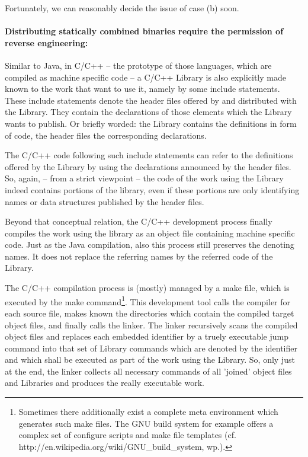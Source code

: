Fortunately, we can reasonably decide the issue of case (b) soon.

\paragraph{Distributing statically combined binaries require the
permission of reverse engineering:}

Similar to Java, in C/C++ -- the prototype of those languages, which are
compiled as machine specific code -- a C/C++ Library is also explicitly made
known to the work that want to use it, namely by some include statements. These
include statements denote the header files offered by and distributed with the
Library. They contain the declarations of those elements which the Library wants
to publish. Or briefly worded: the Library contains the definitions in form of
code, the header files the corresponding declarations.

The C/C++ code following such include statements can refer to the definitions
offered by the Library by using the declarations announced by the header files.
So, again, -- from a strict viewpoint -- the code of the work using the Library
indeed contains portions of the library, even if these portions are only
identifying names or data structures published by the header files.

Beyond that conceptual relation, the C/C++ development process finally compiles
the work using the library as an object file containing machine specific code.
Just as the Java compilation, also this process still preserves the denoting
names. It does not replace the referring names by the referred code of the
Library. 

The C/C++ compilation process is (mostly) managed by a make file, which is
executed by the make command\footnote{Sometimes there additionally exist a
complete meta environment which generates such make files. The GNU build system
for example offers a complex set of configure scripts and make file templates
(cf. http://en.wikipedia.org/wiki/GNU\_build\_system, wp.).}. This development
tool calls the compiler for each source file, makes known the directories which
contain the compiled target object files, and finally calls the linker.
The linker recursively scans the compiled object files and replaces each
embedded identifier by a truely executable jump command into that set of Library
commands which are denoted by the identifier and which shall be executed as part
of the work using the Library. So, only just at the end, the linker collects all
necessary commands of all 'joined' object files and Libraries and produces the
really executable work.

